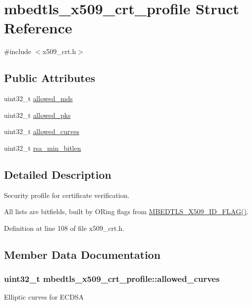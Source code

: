 \hypertarget{structmbedtls__x509__crt__profile}{\section{mbedtls\-\_\-x509\-\_\-crt\-\_\-profile Struct Reference}
\label{structmbedtls__x509__crt__profile}
}


{\ttfamily \#include $<$x509\-\_\-crt.\-h$>$}

\subsection*{Public Attributes}
\begin{DoxyCompactItemize}
\item 
uint32\-\_\-t \hyperlink{structmbedtls__x509__crt__profile_a1251640211d47c8e4b80b99d5b178685}{allowed\-\_\-mds}
\item 
uint32\-\_\-t \hyperlink{structmbedtls__x509__crt__profile_a13cba76eca3f0bce8a93b8f59fe69370}{allowed\-\_\-pks}
\item 
uint32\-\_\-t \hyperlink{structmbedtls__x509__crt__profile_a8149f4d17f3f465e2255f5af997e4c8e}{allowed\-\_\-curves}
\item 
uint32\-\_\-t \hyperlink{structmbedtls__x509__crt__profile_a094e9eb35ed5e9a16b67d2e8bd97e83c}{rsa\-\_\-min\-\_\-bitlen}
\end{DoxyCompactItemize}


\subsection{Detailed Description}
Security profile for certificate verification.

All lists are bitfields, built by O\-Ring flags from \hyperlink{group__x509__module_gaedcb73f1c615c266a348a0c62763c5de}{M\-B\-E\-D\-T\-L\-S\-\_\-\-X509\-\_\-\-I\-D\-\_\-\-F\-L\-A\-G()}. 

Definition at line 108 of file x509\-\_\-crt.\-h.



\subsection{Member Data Documentation}
\hypertarget{structmbedtls__x509__crt__profile_a8149f4d17f3f465e2255f5af997e4c8e}{
\subsubsection[{allowed\-\_\-curves}]{\setlength{\rightskip}{0pt plus 5cm}uint32\-\_\-t mbedtls\-\_\-x509\-\_\-crt\-\_\-profile\-::allowed\-\_\-curves}}\label{structmbedtls__x509__crt__profile_a8149f4d17f3f465e2255f5af997e4c8e}
Elliptic curves for E\-C\-D\-S\-A 

